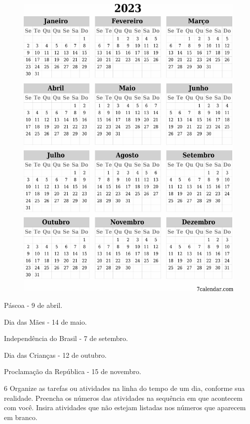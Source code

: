 \begin{figure}[H]
\centering
\includegraphics[width=.8\textwidth]{./media/image52.png}
\end{figure}

\begin{escolha}[itemsep=-5pt]
\item  Páscoa - 9 de abril.

\item  Dia das Mães - 14 de maio.

\item  Independência do Brasil - 7 de setembro.

\item  Dia das Crianças - 12 de outubro.

\item  Proclamação da República - 15 de novembro.
\end{escolha}

\vspace*{.5em}

\num{6} Organize as tarefas ou atividades na linha do tempo de um dia, conforme
sua realidade. Preencha os números das atividades na sequência em que acontecem com você. Insira atividades que não estejam listadas nos números que aparecem em branco.

